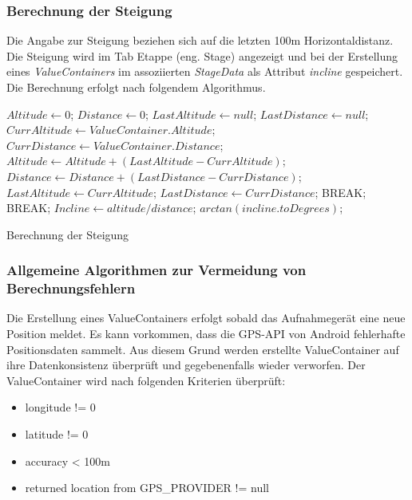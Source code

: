 \subsubsection{Berechnung der Steigung}
Die Angabe zur Steigung beziehen sich auf die letzten 100m Horizontaldistanz. Die Steigung wird im Tab Etappe (eng. Stage) angezeigt und bei der Erstellung eines \textit{ValueContainers} im assoziierten \textit{StageData} als Attribut \textit{incline} gespeichert. Die Berechnung erfolgt nach folgendem Algorithmus.


\begin{algorithm}[H]
\begin{algorithmic}[1]
\vspace{5pt}
\State $Altitude \gets 0$;
\State $Distance \gets 0$;
\State $LastAltitude \gets null$;
\State $LastDistance \gets null$;
\State $CurrAltitude \gets ValueContainer.Altitude$;
\State $CurrDistance \gets ValueContainer.Distance$;
\State $Altitude \gets Altitude + (LastAltitude - CurrAltitude)$;
\State $Distance \gets Distance + (LastDistance - CurrDistance)$;
\EndIf
\State $LastAltitude \gets CurrAltitude$;
\State $LastDistance \gets CurrDistance$;
\State BREAK;
\EndIf
\Else
\State BREAK;
\EndIf
\EndFor
\State $Incline \gets altitude/distance$;
\State \Return $arctan(incline.toDegrees)$;
\end{algorithmic}
\caption{Berechnung der Steigung}
\end{algorithm}

\subsubsection{Allgemeine Algorithmen zur Vermeidung von Berechnungsfehlern}
Die Erstellung eines ValueContainers erfolgt sobald das Aufnahmegerät eine neue Position meldet. Es kann vorkommen, dass die GPS-API von Android fehlerhafte Positionsdaten sammelt. Aus diesem Grund werden erstellte ValueContainer auf ihre Datenkonsistenz überprüft und gegebenenfalls wieder verworfen. Der ValueContainer wird nach folgenden Kriterien überprüft:
\begin{itemize} [noitemsep,topsep=0pt]
\item longitude != 0
\item latitude != 0
\item accuracy < 100m
\item returned location from GPS\_PROVIDER != null
\end{itemize}
